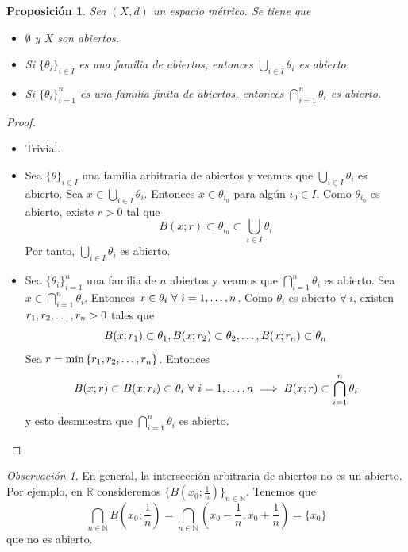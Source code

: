 \documentclass[12pt]{report}
\newtheorem{proposition}{Proposición}[chapter]
\theoremstyle{definition}
\theoremstyle{definition}
\theoremstyle{remark}
\newtheorem*{obs}{Observación} %
\newcommand{\R}{\mathbb R}
\newcommand{\N}{\mathbb N}
\begin{document}
\begin{proposition}
\label{prop0.2.}
Sea $(X,d)$ un espacio métrico. Se tiene que
\begin{itemize}
    \item[(i)] $\emptyset$ y $X$ son abiertos.
    \item[(ii)] Si $\{\theta_i\}_{i \in I}$ es una familia de abiertos, entonces $\bigcup_{i \in I}\theta_i$ es abierto.
    \item[(iii)] Si $\{\theta_i\}_{i=1}^n$ es una familia finita de abiertos, entonces $\bigcap_{i=1}^n\theta_i$ es abierto.
\end{itemize}
\end{proposition}

\begin{proof}
\hfill
\begin{itemize}
    \item[(i)] Trivial.
    \item[(ii)] Sea $\{\theta\}_{i \in I}$ una familia arbitraria de abiertos y veamos que $\bigcup_{i \in I}\theta_i$ es abierto. Sea $x \in \bigcup_{i \in I}\theta_i$. Entonces $x \in \theta_{i_0}$ para algún $i_0 \in I$. Como $\theta_{i_0}$ es abierto, existe $r>0$ tal que \[B(x;r) \subset \theta_{i_0} \subset \bigcup_{i \in I}\theta_i\] Por tanto, $\bigcup_{i \in I}\theta_i$ es abierto.
    \item[(iii)] Sea $\{\theta_i\}_{i=1}^n$ una familia de $n$ abiertos y veamos que $\bigcap_{i=1}^n\theta_i$ es abierto. Sea $x \in \bigcap_{i=1}^n\theta_i$. Entonces $x \in \theta_i \ \forall \ i=1,\mathellipsis,n$. Como $\theta_i$ es abierto $\forall \ i$, existen $r_1,r_2,\mathellipsis,r_n > 0$ tales que \[B(x;r_1) \subset \theta_1,B(x;r_2) \subset \theta_2,\mathellipsis,B(x;r_n) \subset \theta_n\] Sea $r=\min{\{r_1,r_2,\mathellipsis,r_n\}}$. Entonces \[B(x;r) \subset B(x;r_i) \subset \theta_i \ \forall \ i=1,\mathellipsis,n \implies B(x;r) \subset \bigcap_{i=1}^n\theta_i\] y esto desmuestra que $\bigcap_{i=1}^n\theta_i$ es abierto.
\end{itemize}
\end{proof}

\begin{obs}
En general, la intersección arbitraria de abiertos no es un abierto. Por ejemplo, en $\R$ consideremos $\{B(x_0;\frac{1}{n})\}_{n\in \N}$. Tenemos que 
\[\bigcap_{n \in \N}B(x_0;\frac{1}{n}) = \bigcap_{n \in \N}(x_0-\frac{1}{n},x_0+\frac{1}{n}) = \{x_0\}\] que no es abierto.
\end{obs}
\end{document}
